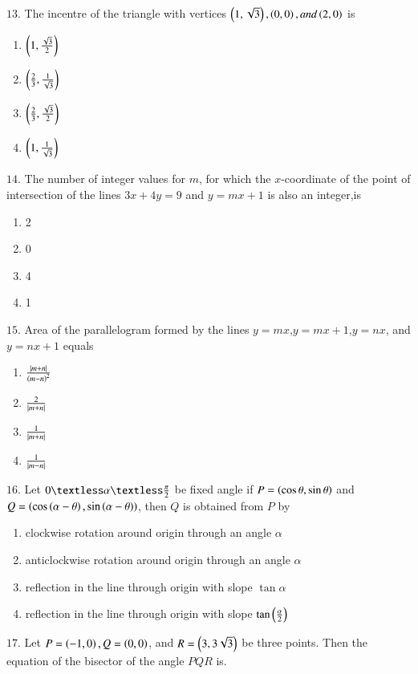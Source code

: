 \documentclass[journal,12pt,twocolumn]{IEEEtran}
\theoremstyle{remark}
\begin{document}
{\begin{enumerate}[label=(\alph*)]
\end{enumerate}
$13.$ The incentre of the triangle with vertices $\left(1,\sqrt{3}\right),\left(0,0\right),and \left(2,0\right)$ is \hfill{}
\begin{enumerate}[label=(\alph*)]
    \item $\left(1,\frac{\sqrt{3}}{2}\right)$
    \item $\left(\frac{2}{3},\frac{1}{\sqrt{3}}\right)$
    \item $\left(\frac{2}{3},\frac{\sqrt{3}}{2}\right)$
    \item $\left(1,\frac{1}{\sqrt{3}}\right)$
\end{enumerate}
$14$. The number of integer values for $m$, for which the $x$-coordinate of the point of intersection of the lines $3x+4y=9$ and $y=mx+1$ is also an integer,is \hfill{}
\begin{enumerate}[label=(\alph*)]
    \item 2
    \item 0
    \item 4
    \item 1
\end{enumerate}
$15$. Area of the parallelogram formed by the lines $y=mx$,$y=mx+1$,$y=nx$, and $y=nx+1$ equals \hfill{}
\begin{enumerate}[label=(\alph*)]
    \item $\frac{\left\vert m+n\right\vert}{\left(m-n\right)^{2}}$
    \item $\frac{2}{\left\vert m+n\right\vert}$
    \item $\frac{1}{\left\vert m+n\right\vert}$
    \item $\frac{1}{\left\vert m-n\right\vert}$
\end{enumerate}
$16$. Let $0\textless\alpha\textless\frac{\pi}{2}$ be fixed angle if $P=\left(\cos\theta,\sin\theta\right)$ and $Q=\left(\cos\left(\alpha-\theta\right),\sin\left(\alpha-\theta\right)\right)$, then $Q$ is obtained from $P$ by \hfill{}
\begin{enumerate}[label=(\alph*)]
    \item clockwise rotation around origin through an angle $\alpha$
    \item anticlockwise rotation around origin through an angle $\alpha$
    \item reflection in the line through origin with slope $\tan\alpha$
    \item reflection in the line through origin with slope $\tan\left(\frac{\alpha}{2}\right)$
\end{enumerate}
$17$. Let $P=\left(-1,0\right),Q=\left(0,0\right)$, and $R=\left(3,3\sqrt{3}\right)$ be three points. Then the equation of the bisector of the angle $PQR$ is. \hfill{}
}
\end{document}

